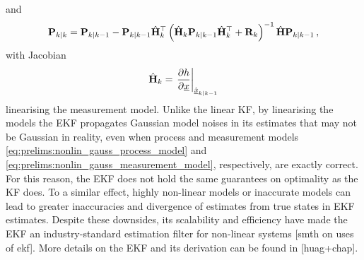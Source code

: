 and
\begin{equation}\label{eq:prelims:ekf_cov_update}
    {\ensuremath{{\mathbf{P}}}}_{k|k} = {{\mathbf{P}}}_{k|k-1}-{{\mathbf{P}}}_{k|k-1}\hat{{{\mathbf{H}}}}_k^\top\left(\hat{{{\mathbf{H}}}}_k{{\mathbf{P}}}_{k|k-1}\hat{{{\mathbf{H}}}}_k^\top + {{\mathbf{R}}}_k\right)^{-1}\hat{{{\mathbf{H}}}}{{\mathbf{P}}}_{k|k-1}\,,
\end{equation}
with Jacobian
\begin{equation}\label{eq:prelims:ekf_update_jacobian}
    \hat{{{\mathbf{H}}}}_k = \left.\frac{\partial h}{\partial {\underline{x}}}\right|_{\hat{{\underline{x}}}_{k|k-1}}
\end{equation}
linearising the measurement model. Unlike the linear KF, by linearising the models the EKF propagates Gaussian model noises in its estimates that may not be Gaussian in reality, even when process and measurement models \eqref{eq:prelims:nonlin_gauss_process_model} and \eqref{eq:prelims:nonlin_gauss_measurement_model}, respectively, are exactly correct. For this reason, the EKF does not hold the same guarantees on optimality as the KF does. To a similar effect, highly non-linear models or inaccurate models can lead to greater inaccuracies and divergence of estimates from true states in EKF estimates. Despite these downsides, its scalability and efficiency have made the EKF an industry-standard estimation filter for non-linear systems [smth on uses of ekf]. More details on the EKF and its derivation can be found in [huag+chap].

% 
% 

